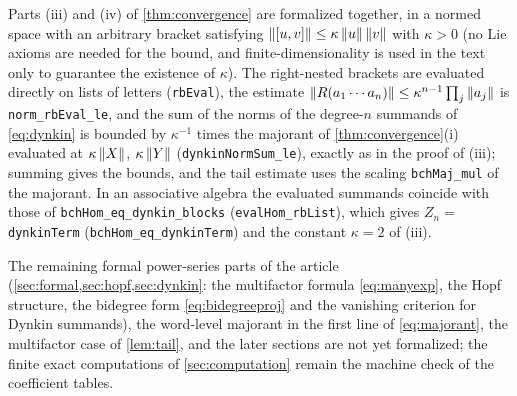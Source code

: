 Parts (iii) and (iv) of \cref{thm:convergence} are formalized together, in
a normed space with an arbitrary bracket satisfying
$\left\lVert[u,v]\right\rVert\leq\kappa\left\lVert u\right\rVert\left\lVert v\right\rVert$ with $\kappa>0$ (no Lie axioms are
needed for the bound, and finite-dimensionality is used in the text only
to guarantee the existence of $\kappa$). The right-nested brackets are
evaluated directly on lists of letters (\texttt{rbEval}), the estimate
$\left\lVert R(a_1\cdots a_n)\right\rVert\leq\kappa^{n-1}\prod_j\left\lVert a_j\right\rVert$ is
\texttt{norm\_rbEval\_le}, and the sum of the norms of the degree-$n$
summands of \eqref{eq:dynkin} is bounded by $\kappa^{-1}$ times the
majorant of \cref{thm:convergence}(i) evaluated at $\kappa\left\lVert X\right\rVert$,
$\kappa\left\lVert Y\right\rVert$ (\texttt{dynkinNormSum\_le}), exactly as in the proof of
(iii); summing gives the bounds, and the tail estimate uses the scaling
\texttt{bchMaj\_mul} of the majorant. In an associative algebra the
evaluated summands coincide with those of \texttt{bchHom\_eq\_dynkin\_blocks}
(\texttt{evalHom\_rbList}), which gives $Z_n=$ \texttt{dynkinTerm}
(\texttt{bchHom\_eq\_dynkinTerm}) and the constant $\kappa=2$ of (iii).

The remaining formal power-series parts of the article
(\cref{sec:formal,sec:hopf,sec:dynkin}: the multifactor formula
\eqref{eq:manyexp}, the Hopf structure, the bidegree form
\eqref{eq:bidegreeproj} and the vanishing criterion for Dynkin summands),
the word-level majorant in the first
line of \eqref{eq:majorant},
the multifactor case of \cref{lem:tail}, and the later sections are not yet
formalized; the finite exact computations of \cref{sec:computation} remain
the machine check of the coefficient tables.
